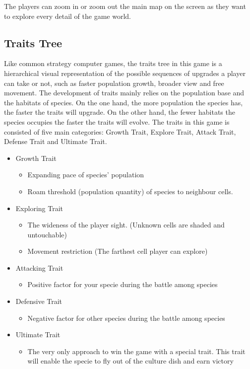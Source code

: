 	The players can zoom in or zoom out the main map on the screen as they want to explore every detail of the game world.
	\subsection{Traits Tree}
	Like common strategy computer games, the traits tree in this game is a hierarchical visual representation of the possible sequences of upgrades a player can take or not, such as faster population growth, broader view and free movement. The development of traits mainly relies on the population base and the habitats of species. On the one hand, the more population the species has, the faster the traits will upgrade. On the other hand, the fewer habitats the species occupies the faster the traits will evolve. The traits in this game is consisted of five main categories: Growth Trait, Explore Trait, Attack Trait, Defense Trait and Ultimate Trait.
	

	\begin{itemize}
		\item Growth Trait
		\begin{itemize}
			\item Expanding pace of species' population
			\item Roam threshold (population quantity) of species to neighbour cells.
		\end{itemize}
		\item Exploring Trait
		\begin{itemize}
			\item The wideness of the player sight. (Unknown cells are shaded and untouchable)
			\item Movement restriction (The farthest cell player can explore)
		\end{itemize}
		\item Attacking Trait
		\begin{itemize}
			\item Positive factor for your specie during the battle among species
		\end{itemize}
		\item Defensive Trait
		\begin{itemize}
			\item Negative factor for other species during the battle among species
		\end{itemize}
		\item Ultimate Trait
		\begin{itemize}
			\item The very only approach to win the game with a special trait. This trait will enable the specie to fly out of the culture dish and earn victory
		\end{itemize}
	\end{itemize}
	
